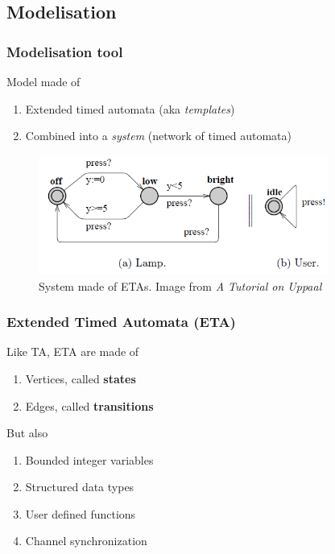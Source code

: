 \documentclass{bredelebeamer}
\begin{document}
\subsection{Modelisation}
\begin{frame}
	\frametitle{Modelisation tool}
	\begin{block}{Model made of}
		\begin{enumerate}
			\item Extended timed automata (aka \textit{templates})
			\item Combined into a \textit{system} (network of timed automata)
		\end{enumerate}
	\end{block}
	\begin{figure}
    	\centering
    	\includegraphics[width = 0.85\textwidth]{timed_automata_uppaal.png}
    	\caption{System made of ETAs. Image from \textit{A Tutorial on Uppaal}}
  	\end{figure}
	
\end{frame}

\begin{frame}
	\frametitle{Extended Timed Automata (ETA)}
	\begin{block}{Like TA, ETA are made of}
		\begin{enumerate}
			\item Vertices, called \textbf{states}
			\item Edges, called \textbf{transitions}
		\end{enumerate}
	\end{block}
	
	\begin{block}{But also}
		\begin{enumerate}
			\item Bounded integer variables
			\item Structured data types
			\item User defined functions
			\item Channel synchronization
		\end{enumerate}
	\end{block}
	
\end{frame}
\end{document}
